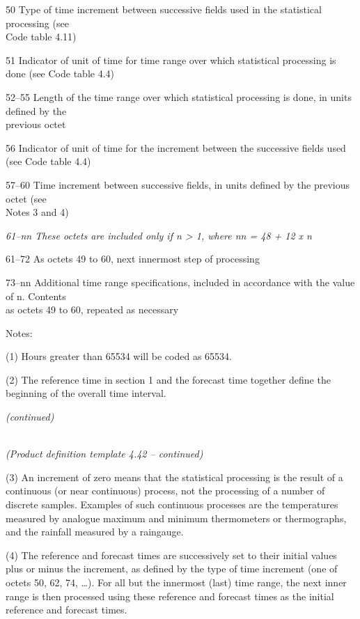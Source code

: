 50 Type of time increment between successive fields used in the statistical processing (see\\
Code table 4.11)

51 Indicator of unit of time for time range over which statistical processing is done (see Code table 4.4)

52--55 Length of the time range over which statistical processing is done, in units defined by the\\
previous octet

56 Indicator of unit of time for the increment between the successive fields used (see Code table 4.4)

57--60 Time increment between successive fields, in units defined by the previous octet (see\\
Notes 3 and 4)

\emph{61--nn These octets are included only if n \textgreater{} 1, where nn = 48 + 12 x n}

61--72 As octets 49 to 60, next innermost step of processing

73--nn Additional time range specifications, included in accordance with the value of n. Contents\\
as octets 49 to 60, repeated as necessary

Notes:

(1) Hours greater than 65534 will be coded as 65534.

(2) The reference time in section 1 and the forecast time together define the beginning of the overall time interval.

\emph{(continued)}

\emph{\\
(Product definition template 4.42 -- continued)}

(3) An increment of zero means that the statistical processing is the result of a continuous (or near continuous) process, not the processing of a number of discrete samples. Examples of such continuous processes are the temperatures measured by analogue maximum and minimum thermometers or thermographs, and the rainfall measured by a raingauge.

(4) The reference and forecast times are successively set to their initial values plus or minus the increment, as defined by the type of time increment (one of octets 50, 62, 74, \ldots). For all but the innermost (last) time range, the next inner range is then processed using these reference and forecast times as the initial reference and forecast times.

